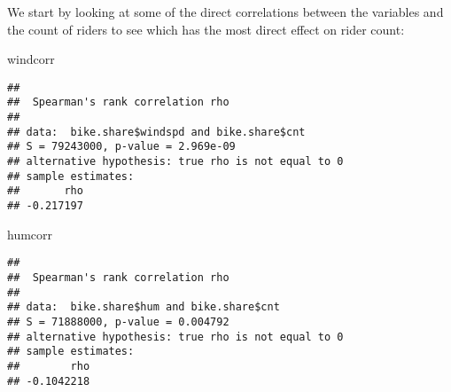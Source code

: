 \documentclass[]{article}
\newenvironment{Shaded}{\begin{snugshade}}{\end{snugshade}}
\newcommand{\KeywordTok}[1]{\textcolor[rgb]{0.13,0.29,0.53}{\textbf{#1}}}
\newcommand{\DataTypeTok}[1]{\textcolor[rgb]{0.13,0.29,0.53}{#1}}
\newcommand{\StringTok}[1]{\textcolor[rgb]{0.31,0.60,0.02}{#1}}
\newcommand{\OperatorTok}[1]{\textcolor[rgb]{0.81,0.36,0.00}{\textbf{#1}}}
\newcommand{\NormalTok}[1]{#1}
\begin{document}
We start by looking at some of the direct correlations between the
variables and the count of riders to see which has the most direct
effect on rider count:

\begin{Shaded}
\end{Shaded}

\begin{Shaded}
\begin{Highlighting}[]
\NormalTok{windcorr}
\end{Highlighting}
\end{Shaded}

\begin{verbatim}
## 
##  Spearman's rank correlation rho
## 
## data:  bike.share$windspd and bike.share$cnt
## S = 79243000, p-value = 2.969e-09
## alternative hypothesis: true rho is not equal to 0
## sample estimates:
##       rho 
## -0.217197
\end{verbatim}

\begin{Shaded}
\begin{Highlighting}[]
\NormalTok{humcorr}
\end{Highlighting}
\end{Shaded}

\begin{verbatim}
## 
##  Spearman's rank correlation rho
## 
## data:  bike.share$hum and bike.share$cnt
## S = 71888000, p-value = 0.004792
## alternative hypothesis: true rho is not equal to 0
## sample estimates:
##        rho 
## -0.1042218
\end{verbatim}
\end{document}
